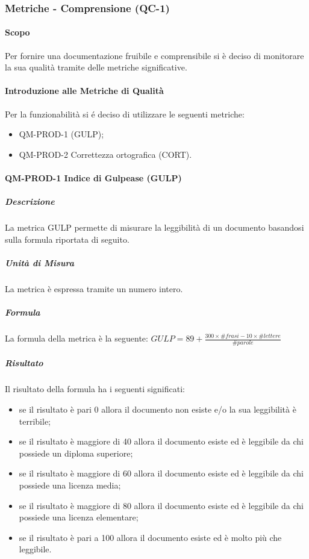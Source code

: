 		\subsubsection{Metriche - Comprensione (QC-1)}
			\paragraph{Scopo}
				Per fornire una documentazione fruibile e comprensibile si è deciso di monitorare la sua qualità tramite delle metriche significative.
			\paragraph{Introduzione alle Metriche di Qualità}
				Per la funzionabilità si é deciso di utilizzare le seguenti metriche:
				\begin{itemize}
					\item QM-PROD-1  (GULP);
					\item QM-PROD-2 Correttezza ortografica (CORT).
				\end{itemize}
			\paragraph{QM-PROD-1 Indice di Gulpease (GULP)}
				\subparagraph{Descrizione}
					La metrica GULP permette di misurare la leggibilità di un documento basandosi sulla formula riportata di seguito.
				\subparagraph{Unità di Misura}
					La metrica è espressa tramite un numero intero.
				\subparagraph{Formula}
					La formula della metrica è la seguente:
					\(
						GULP = 89+\frac{300\times\# frasi-10\times\#lettere}{\#parole}
					\)
				\subparagraph{Risultato}
					Il risultato della formula ha i seguenti significati:
					\begin{itemize}
						\item se il risultato è pari 0 allora il documento non esiste e/o la sua leggibilità è terribile;
						\item se il risultato è maggiore di 40 allora il documento esiste ed è leggibile da chi possiede un diploma superiore;
						\item se il risultato è maggiore di 60 allora il documento esiste ed è leggibile da chi possiede una licenza media;
						\item se il risultato è maggiore di 80 allora il documento esiste ed è leggibile da chi possiede una licenza elementare;
						\item se il risultato è pari a 100 allora il documento esiste ed è molto più che leggibile.
						\end{itemize}
